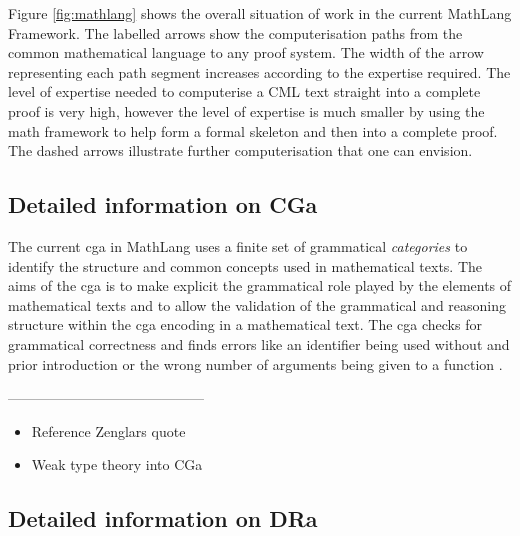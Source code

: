Figure \ref{fig:mathlang} shows the overall situation of work in the current MathLang Framework.
The labelled arrows show the computerisation paths from the common mathematical language to any proof system. The width of the arrow representing each path segment increases according to the expertise required. The level of expertise needed to computerise a CML text straight into a complete proof is very high, however the level of expertise is much smaller by using the \gls{math} framework to help form a formal skeleton and then into a complete proof. The dashed arrows illustrate further computerisation that one can envision.


\subsection{Detailed information on CGa}
\label{subsec:cga}
The current \gls{cga} in MathLang uses a finite set of grammatical \textit{categories} to identify the structure and common concepts used in mathematical texts. The aims of the \gls{cga} is to make explicit the grammatical role played by the elements of mathematical texts and to allow the validation of the grammatical and reasoning structure within the \gls{cga} encoding in a mathematical text. The \gls{cga} checks for grammatical correctness and finds errors like an identifier being used without and prior introduction or the wrong number of arguments being given to a function \cite{krzysztofphd}.

------------------------------------------

\begin{itemize}
\item Reference Zenglars quote

\item Weak type theory into CGa

\end{itemize}

\subsection{Detailed information on DRa}
\label{subsec:dra}

